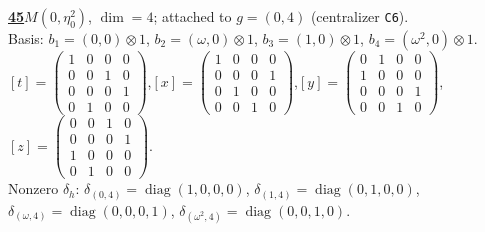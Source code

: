 \begin{samepage}\noindent\textbf{\underline{45}}\quad $M(0,\eta^{2}_{0})$, $\dim=4$; attached to $g=(0,4)$ (centralizer \texttt{C6}).\\
Basis: $b_{1}=(0,0)\otimes 1$, $b_{2}=(\omega,0)\otimes 1$, $b_{3}=(1,0)\otimes 1$, $b_{4}=(\omega^2,0)\otimes 1$.\\
$[t]=\left(\begin{smallmatrix} 1 & 0 & 0 & 0 \\ 0 & 0 & 1 & 0 \\ 0 & 0 & 0 & 1 \\ 0 & 1 & 0 & 0 \end{smallmatrix}\right)$,\quad $[x]=\left(\begin{smallmatrix} 1 & 0 & 0 & 0 \\ 0 & 0 & 0 & 1 \\ 0 & 1 & 0 & 0 \\ 0 & 0 & 1 & 0 \end{smallmatrix}\right)$,\quad $[y]=\left(\begin{smallmatrix} 0 & 1 & 0 & 0 \\ 1 & 0 & 0 & 0 \\ 0 & 0 & 0 & 1 \\ 0 & 0 & 1 & 0 \end{smallmatrix}\right)$,\quad $[z]=\left(\begin{smallmatrix} 0 & 0 & 1 & 0 \\ 0 & 0 & 0 & 1 \\ 1 & 0 & 0 & 0 \\ 0 & 1 & 0 & 0 \end{smallmatrix}\right)$.\\
Nonzero $\delta_h$: $\delta_{(0,4)}=\operatorname{diag}(1,0,0,0)$, $\delta_{(1,4)}=\operatorname{diag}(0,1,0,0)$, $\delta_{(\omega,4)}=\operatorname{diag}(0,0,0,1)$, $\delta_{(\omega^2,4)}=\operatorname{diag}(0,0,1,0)$.\end{samepage}
\medskip


